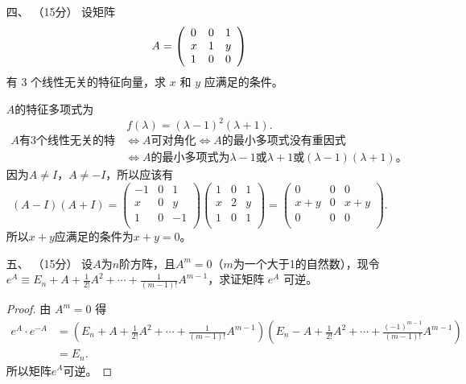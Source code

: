\begin{enumerate}[1~]
\item[四、]（15分）
设矩阵 
$$
A = \left( \begin{array} { l l l } { 0 } & { 0 } & { 1 } \\ { x } & { 1 } & { y } \\ { 1 } & { 0 } & { 0 } \end{array} \right)
$$
有 3 个线性无关的特征向量，求 $x$ 和 $y$ 应满足的条件。
\begin{solution}
$A$的特征多项式为\[
f(\lambda)=(\lambda-1)^2(\lambda+1).
\]
\begin{align*}
\text{$A$有3个线性无关的特征向量}&\Longleftrightarrow \text{$A$可对角化}\Longleftrightarrow \text{$A$的最小多项式没有重因式}\\
&\Longleftrightarrow \text{$A$的最小多项式为$\lambda-1$或$\lambda+1$或$(\lambda-1)(\lambda+1)$。}
\end{align*}
因为$A\ne I$，$A\ne -I$，所以应该有\[
(A-I)(A+I)=\left( \begin{matrix}
	-1&		0&		1\\
	x&		0&		y\\
	1&		0&		-1\\
\end{matrix} \right) \left( \begin{matrix}
	1&		0&		1\\
	x&		2&		y\\
	1&		0&		1\\
\end{matrix} \right) =\left( \begin{matrix}
	0&		0&		0\\
	x+y&		0&		x+y\\
	0&		0&		0\\
\end{matrix} \right) .
\]
所以$x+y$应满足的条件为$x+y=0$。
\end{solution}

\item[五、]（15分）
设$A$为$n$阶方阵，且$A^m=0$（$m$为一个大于1的自然数），现令 $e ^ { A } \equiv E _ { n } + A + \frac { 1 } { 2 ! } A ^ { 2 } + \cdots + \frac { 1 } { ( m - 1 ) ! } A ^ { m - 1 }$，求证矩阵 $e^A$ 可逆。

\begin{proof}
由 $A^m=0$ 得\begin{align*}
e^A\cdot e^{-A}&=\left(E _ { n } + A + \frac { 1 } { 2 ! } A ^ { 2 } + \cdots + \frac { 1 } { ( m - 1 ) ! } A ^ { m - 1 }\right)\left(E _ { n } - A + \frac { 1 } { 2 ! } A ^ { 2 } + \cdots + \frac { (-1)^{m-1} } { ( m - 1 ) ! } A ^ { m - 1 }\right)\\
&=E_n.
\end{align*}
所以矩阵$e^A$可逆。
\end{proof}


\end{enumerate}
